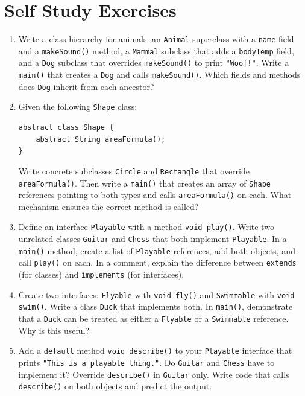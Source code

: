 \documentclass[twoside=false,DIV=14]{scrartcl}
\begin{document}
\section*{Self Study Exercises}
\begin{enumerate}

\item Write a class hierarchy for animals: an \texttt{Animal} superclass with a \texttt{name} field and a \texttt{makeSound()} method, a \texttt{Mammal} subclass that adds a \texttt{bodyTemp} field, and a \texttt{Dog} subclass that overrides \texttt{makeSound()} to print \texttt{"Woof!"}.  Write a \texttt{main()} that creates a \texttt{Dog} and calls \texttt{makeSound()}.  Which fields and methods does \texttt{Dog} inherit from each ancestor?

\item Given the following \texttt{Shape} class:
\begin{verbatim}
abstract class Shape {
    abstract String areaFormula();
}
\end{verbatim}
Write concrete subclasses \texttt{Circle} and \texttt{Rectangle} that override \texttt{areaFormula()}.  Then write a \texttt{main()} that creates an array of \texttt{Shape} references pointing to both types and calls \texttt{areaFormula()} on each.  What mechanism ensures the correct method is called?

\item Define an interface \texttt{Playable} with a method \texttt{void play()}.  Write two unrelated classes \texttt{Guitar} and \texttt{Chess} that both implement \texttt{Playable}.  In a \texttt{main()} method, create a list of \texttt{Playable} references, add both objects, and call \texttt{play()} on each.  In a comment, explain the difference between \texttt{extends} (for classes) and \texttt{implements} (for interfaces).

\item Create two interfaces: \texttt{Flyable} with \texttt{void fly()} and \texttt{Swimmable} with \texttt{void swim()}.  Write a class \texttt{Duck} that implements both.  In \texttt{main()}, demonstrate that a \texttt{Duck} can be treated as either a \texttt{Flyable} or a \texttt{Swimmable} reference.  Why is this useful?

\item Add a \texttt{default} method \texttt{void describe()} to your \texttt{Playable} interface that prints \texttt{"This is a playable thing."}.  Do \texttt{Guitar} and \texttt{Chess} have to implement it?  Override \texttt{describe()} in \texttt{Guitar} only.  Write code that calls \texttt{describe()} on both objects and predict the output.


\end{enumerate}
\end{document}
